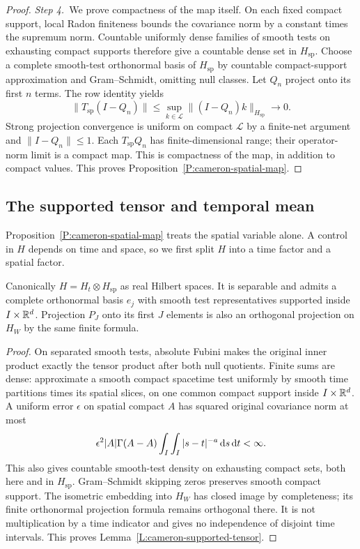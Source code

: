 \begin{proof}
  \medskip
  \noindent\textit{Step 4.~}We prove compactness of the map itself.
  On each fixed compact support, local Radon finiteness bounds the covariance
  norm by a constant times the supremum norm. Countable uniformly dense
  families of smooth tests on exhausting compact supports therefore give a
  countable dense set in $H_{\mathrm{sp}}$.
  Choose a complete smooth-test orthonormal basis of $H_{\mathrm{sp}}$ by
  countable compact-support approximation and Gram--Schmidt, omitting null
  classes. Let $Q_n$ project onto its first $n$ terms. The row identity yields
  \[
    \|T_{\mathrm{sp}}(I-Q_n)\|
    \le\sup_{k\in\mathcal{L}}\|(I-Q_n)k\|_{H_{\mathrm{sp}}}
    \longrightarrow0.
  \]
  Strong projection convergence is uniform on compact $\mathcal{L}$ by a
  finite-net argument and $\|I-Q_n\| \le 1$. Each $T_{\mathrm{sp}}Q_n$ has
  finite-dimensional range; their operator-norm limit is a compact map. This is
  compactness of the map, in addition to compact values. This proves
  Proposition~\ref{P:cameron-spatial-map}.
\end{proof}

\subsection{The supported tensor and temporal mean}

Proposition~\ref{P:cameron-spatial-map} treats the spatial variable alone. A
control in $H$ depends on time and space, so we first split $H$ into a time
factor and a spatial factor.

\begin{lemma}\label{L:cameron-supported-tensor}
  Canonically $H = H_t\otimes H_{\mathrm{sp}}$ as real Hilbert spaces. It is
  separable and admits a complete orthonormal basis $e_j$ with smooth test
  representatives supported inside $I\times\mathbb{R}^d$. Projection $P_J$ onto its
  first $J$ elements is also an orthogonal projection on $H_W$ by the same
  finite formula.
\end{lemma}

\begin{proof}
  On separated smooth tests, absolute Fubini makes the original inner product
  exactly the tensor product after both null quotients. Finite sums are dense:
  approximate a smooth compact spacetime test uniformly by smooth time
  partitions times its spatial slices, on one common compact support inside
  $I\times\mathbb{R}^d$. A uniform error $\epsilon$ on spatial compact $A$ has squared
  original covariance norm at most
  \[
    \epsilon^2|A|\Gamma(A-A)
    \int_I\int_I|s-t|^{-a}\,\mathrm{d} s\,\mathrm{d} t<\infty.
  \]
  This also gives countable smooth-test density on exhausting compact sets, both
  here and in $H_{\mathrm{sp}}$. Gram--Schmidt skipping zeros preserves smooth
  compact support. The isometric embedding into $H_W$ has closed image by
  completeness; its finite orthonormal projection formula remains orthogonal
  there. It is not multiplication by a time indicator and gives no independence
  of disjoint time intervals. This proves
  Lemma~\ref{L:cameron-supported-tensor}.
\end{proof}

